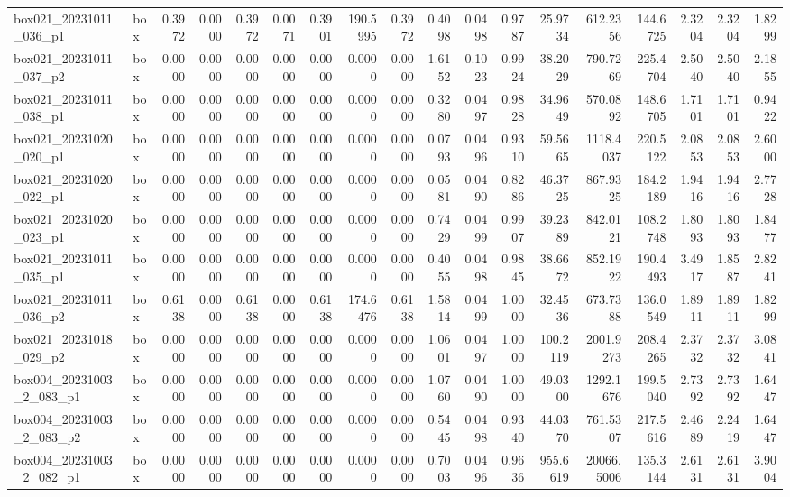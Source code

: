 \begin{table}[t]
{\begin{tabular}{l l r r r r r r r r r r r r r r r r }
box021\_20231011\_036\_p1 & box & 0.3972 & 0.0000 & 0.3972 & 0.0071 & 0.3901 & 190.5995 & 0.3972 & 0.4098 & 0.0498 & 0.9787 & 25.9734 & 612.2356 & 144.6725 & 2.3204 & 2.3204 & 1.8299 \\
box021\_20231011\_037\_p2 & box & 0.0000 & 0.0000 & 0.0000 & 0.0000 & 0.0000 & 0.0000 & 0.0000 & 1.6152 & 0.1023 & 0.9924 & 38.2029 & 790.7269 & 225.4704 & 2.5040 & 2.5040 & 2.1855 \\
box021\_20231011\_038\_p1 & box & 0.0000 & 0.0000 & 0.0000 & 0.0000 & 0.0000 & 0.0000 & 0.0000 & 0.3280 & 0.0497 & 0.9828 & 34.9649 & 570.0892 & 148.6705 & 1.7101 & 1.7101 & 0.9422 \\
box021\_20231020\_020\_p1 & box & 0.0000 & 0.0000 & 0.0000 & 0.0000 & 0.0000 & 0.0000 & 0.0000 & 0.0793 & 0.0496 & 0.9310 & 59.5665 & 1118.4037 & 220.5122 & 2.0853 & 2.0853 & 2.6000 \\
box021\_20231020\_022\_p1 & box & 0.0000 & 0.0000 & 0.0000 & 0.0000 & 0.0000 & 0.0000 & 0.0000 & 0.0581 & 0.0490 & 0.8286 & 46.3725 & 867.9325 & 184.2189 & 1.9416 & 1.9416 & 2.7728 \\
box021\_20231020\_023\_p1 & box & 0.0000 & 0.0000 & 0.0000 & 0.0000 & 0.0000 & 0.0000 & 0.0000 & 0.7429 & 0.0499 & 0.9907 & 39.2389 & 842.0121 & 108.2748 & 1.8093 & 1.8093 & 1.8477 \\
box021\_20231011\_035\_p1 & box & 0.0000 & 0.0000 & 0.0000 & 0.0000 & 0.0000 & 0.0000 & 0.0000 & 0.4055 & 0.0498 & 0.9845 & 38.6672 & 852.1922 & 190.4493 & 3.4917 & 1.8587 & 2.8241 \\
box021\_20231011\_036\_p2 & box & 0.6138 & 0.0000 & 0.6138 & 0.0000 & 0.6138 & 174.6476 & 0.6138 & 1.5814 & 0.0499 & 1.0000 & 32.4536 & 673.7388 & 136.0549 & 1.8911 & 1.8911 & 1.8299 \\
box021\_20231018\_029\_p2 & box & 0.0000 & 0.0000 & 0.0000 & 0.0000 & 0.0000 & 0.0000 & 0.0000 & 1.0601 & 0.0497 & 1.0000 & 100.2119 & 2001.9273 & 208.4265 & 2.3732 & 2.3732 & 3.0841 \\
box004\_20231003\_2\_083\_p1 & box & 0.0000 & 0.0000 & 0.0000 & 0.0000 & 0.0000 & 0.0000 & 0.0000 & 1.0760 & 0.0490 & 1.0000 & 49.0300 & 1292.1676 & 199.5040 & 2.7392 & 2.7392 & 1.6447 \\
box004\_20231003\_2\_083\_p2 & box & 0.0000 & 0.0000 & 0.0000 & 0.0000 & 0.0000 & 0.0000 & 0.0000 & 0.5445 & 0.0498 & 0.9340 & 44.0370 & 761.5307 & 217.5616 & 2.4689 & 2.2419 & 1.6447 \\
box004\_20231003\_2\_082\_p1 & box & 0.0000 & 0.0000 & 0.0000 & 0.0000 & 0.0000 & 0.0000 & 0.0000 & 0.7003 & 0.0496 & 0.9636 & 955.6619 & 20066.5006 & 135.3144 & 2.6131 & 2.6131 & 3.9004 \\

\end{tabular}}
\end{table}
